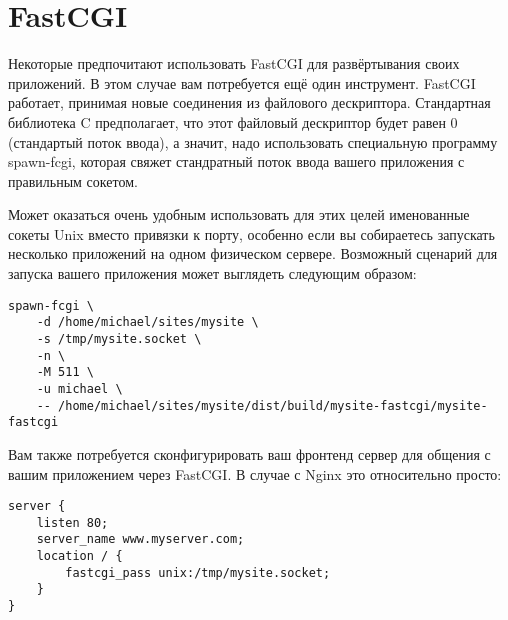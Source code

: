 \section{FastCGI}
%
%
Некоторые предпочитают использовать FastCGI для развёртывания своих приложений. В этом случае вам потребуется ещё один инструмент. FastCGI работает, принимая новые соединения из файлового дескриптора. Стандартная библиотека C предполагает, что этот файловый дескриптор будет равен 0 (стандартый поток ввода), а значит, надо использовать специальную программу spawn-fcgi, которая свяжет стандратный поток ввода вашего приложения с правильным сокетом.

Может оказаться очень удобным использовать для этих целей именованные сокеты Unix вместо привязки к порту, особенно если вы собираетесь запускать несколько приложений на одном физическом сервере. Возможный сценарий для запуска вашего приложения может выглядеть следующим образом:

\begin{lstlisting}
spawn-fcgi \
    -d /home/michael/sites/mysite \
    -s /tmp/mysite.socket \
    -n \
    -M 511 \
    -u michael \
    -- /home/michael/sites/mysite/dist/build/mysite-fastcgi/mysite-fastcgi
\end{lstlisting}
%

Вам также потребуется сконфигурировать ваш фронтенд сервер для общения с вашим приложением через FastCGI. В случае с Nginx это относительно просто:
%
\begin{lstlisting}
server {
    listen 80;
    server_name www.myserver.com;
    location / {
        fastcgi_pass unix:/tmp/mysite.socket;
    }
}
\end{lstlisting}
%

